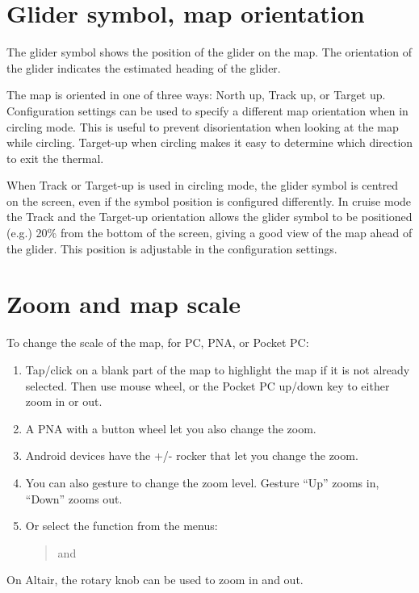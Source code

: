 \section{Glider symbol, map orientation}
The glider symbol shows the position of the glider on the map.  The
orientation of the glider indicates the estimated heading of the
glider.

The map is oriented in one of three ways: North up,
Track up, or Target up.  Configuration settings  can be used
to specify a different map orientation when in circling mode. This is useful to prevent
disorientation when looking at the map while circling.  Target-up when
circling makes it easy to determine which direction to exit the
thermal.

When Track or Target-up is used in circling mode, the glider symbol is
centred on the screen, even if the symbol position is configured differently.
In cruise mode the Track and the Target-up orientation allows the glider
symbol to be positioned (e.g.) 20\% from the bottom of the screen, giving a good view of the
map ahead of the glider.  This position is adjustable in the configuration
 settings.

\section{Zoom and map scale}\label{sec:zooming}

To change the scale of the map, for PC, PNA, or Pocket PC:
\begin{enumerate}
\item Tap/click on a blank part of the map to highlight the map if it is not
already selected.
Then use mouse wheel, or the Pocket PC up/down key to either zoom
in or out.
\item A PNA with a button wheel let you also change the zoom. 
\item Android devices have the +/- rocker that let you change the zoom. 
\item You can also gesture to change the zoom level. Gesture 
``Up'' zooms in, ``Down'' zooms out.
\item Or select the function from the menus:
\begin{quote}
\blink{} and \blink{}
\end{quote}
\end{enumerate}
On Altair, the rotary knob can be used to zoom in and out.

